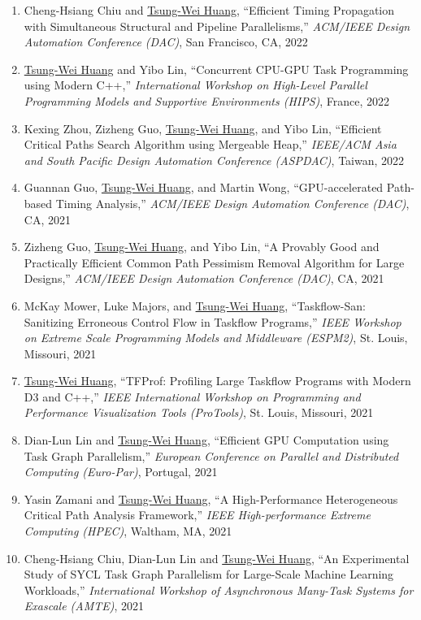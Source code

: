 \documentclass[A4,11pt]{article}
\begin{document}
\begin{enumerate}
    \item Cheng-Hsiang Chiu and \underline{Tsung-Wei Huang}, ``Efficient Timing Propagation with Simultaneous Structural and Pipeline Parallelisms,'' \textit{ACM/IEEE Design Automation Conference (DAC)}, San Francisco, CA, 2022 
    \item \underline{Tsung-Wei Huang} and Yibo Lin, ``Concurrent CPU-GPU Task Programming using Modern C++,'' \textit{International Workshop on High-Level Parallel Programming Models and Supportive Environments (HIPS)}, France, 2022
    \item Kexing Zhou, Zizheng Guo, \underline{Tsung-Wei Huang}, and Yibo Lin, ``Efficient Critical Paths Search Algorithm using Mergeable Heap,'' \textit{IEEE/ACM Asia and South Pacific Design Automation Conference (ASPDAC)}, Taiwan, 2022
    \item Guannan Guo, \underline{Tsung-Wei Huang}, and Martin Wong, ``GPU-accelerated Path-based Timing Analysis,'' \textit{ACM/IEEE Design Automation Conference (DAC)}, CA, 2021
    \item Zizheng Guo, \underline{Tsung-Wei Huang}, and Yibo Lin, ``A Provably Good and Practically Efficient Common Path Pessimism Removal Algorithm for Large Designs,'' \textit{ACM/IEEE Design Automation Conference (DAC)}, CA, 2021
    \item McKay Mower, Luke Majors, and \underline{Tsung-Wei Huang}, ``Taskflow-San: Sanitizing Erroneous Control Flow in Taskflow Programs,'' \textit{IEEE Workshop on Extreme Scale Programming Models and Middleware (ESPM2)}, St. Louis, Missouri, 2021
    \item \underline{Tsung-Wei Huang}, ``TFProf: Profiling Large Taskflow Programs with Modern D3 and C++,'' \textit{IEEE International Workshop on Programming and Performance Visualization Tools (ProTools)}, St. Louis, Missouri, 2021
    \item Dian-Lun Lin and \underline{Tsung-Wei Huang}, ``Efficient GPU Computation using Task Graph Parallelism,'' \textit{European Conference on Parallel and Distributed Computing (Euro-Par)}, Portugal, 2021
    \item Yasin Zamani and \underline{Tsung-Wei Huang}, ``A High-Performance Heterogeneous Critical Path Analysis Framework,'' \textit{IEEE High-performance Extreme Computing (HPEC)}, Waltham, MA, 2021
    \item Cheng-Hsiang Chiu, Dian-Lun Lin and \underline{Tsung-Wei Huang}, ``An Experimental Study of SYCL Task Graph Parallelism for Large-Scale Machine Learning Workloads,'' \textit{International Workshop of Asynchronous Many-Task Systems for Exascale (AMTE)}, 2021

\end{enumerate}
\end{document}
